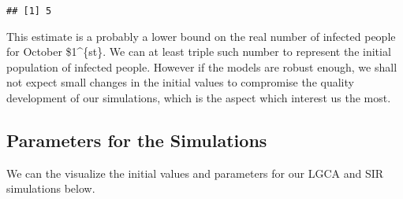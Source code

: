 \documentclass[
]{article}
\newenvironment{Shaded}{\begin{snugshade}}{\end{snugshade}}
\newcommand{\DecValTok}[1]{\textcolor[rgb]{0.00,0.00,0.81}{#1}}
\newcommand{\FloatTok}[1]{\textcolor[rgb]{0.00,0.00,0.81}{#1}}
\newcommand{\FunctionTok}[1]{\textcolor[rgb]{0.13,0.29,0.53}{\textbf{#1}}}
\newcommand{\NormalTok}[1]{#1}
\newcommand{\OtherTok}[1]{\textcolor[rgb]{0.56,0.35,0.01}{#1}}
\newcommand{\SpecialCharTok}[1]{\textcolor[rgb]{0.81,0.36,0.00}{\textbf{#1}}}
\newcommand{\StringTok}[1]{\textcolor[rgb]{0.31,0.60,0.02}{#1}}
\begin{document}
\begin{Shaded}
\end{Shaded}

\begin{verbatim}
## [1] 5
\end{verbatim}

This estimate is a probably a lower bound on the real number of infected
people for October \$1\^{}\{st\}. We can at least triple such number to
represent the initial population of infected people. However if the
models are robust enough, we shall not expect small changes in the
initial values to compromise the quality development of our simulations,
which is the aspect which interest us the most.

\subsection{Parameters for the
Simulations}\label{parameters-for-the-simulations}

We can the visualize the initial values and parameters for our LGCA and
SIR simulations below.

\begin{Shaded}
\end{Shaded}
\end{document}
